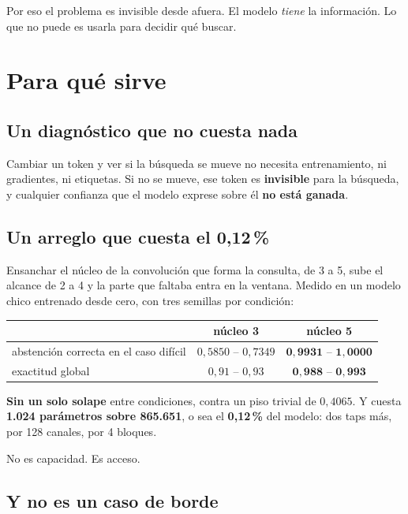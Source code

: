 \documentclass[11pt,a4paper]{article}
\begin{document}
Por eso el problema es invisible desde afuera. El modelo \emph{tiene} la información. Lo que no puede
es usarla para decidir qué buscar.

\section{Para qué sirve}

\subsection*{Un diagnóstico que no cuesta nada}

Cambiar un token y ver si la búsqueda se mueve no necesita entrenamiento, ni gradientes, ni etiquetas.
Si no se mueve, ese token es \textbf{invisible} para la búsqueda, y cualquier confianza que el modelo
exprese sobre él \textbf{no está ganada}.

\subsection*{Un arreglo que cuesta el 0,12\,\%}

Ensanchar el núcleo de la convolución que forma la consulta, de 3 a 5, sube el alcance de 2 a 4 y la
parte que faltaba entra en la ventana. Medido en un modelo chico entrenado desde cero, con tres
semillas por condición:

\begin{center}
\begin{tabular}{lcc}
\toprule
 & núcleo 3 & núcleo 5 \\
\midrule
abstención correcta en el caso difícil & $0{,}5850$ -- $0{,}7349$ & $\mathbf{0{,}9931}$ -- $\mathbf{1{,}0000}$ \\
exactitud global & $0{,}91$ -- $0{,}93$ & $\mathbf{0{,}988}$ -- $\mathbf{0{,}993}$ \\
\bottomrule
\end{tabular}
\end{center}

\textbf{Sin un solo solape} entre condiciones, contra un piso trivial de $0{,}4065$. Y cuesta
\textbf{1.024 parámetros sobre 865.651}, o sea el \textbf{0,12\,\%} del modelo: dos taps más, por 128
canales, por 4 bloques.

No es capacidad. Es acceso.

\subsection*{Y no es un caso de borde}
\end{document}
